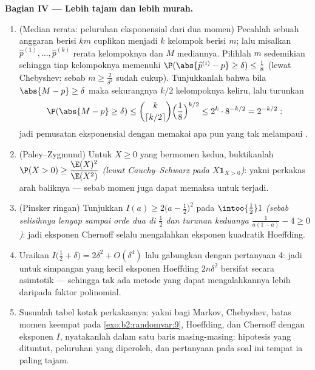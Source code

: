 \begin{problem}
\medskip
\noindent\textbf{Bagian IV --- Lebih tajam dan lebih murah.}
\begin{enumerate}[resume]
  \item (Median rerata: peluruhan eksponensial dari dua momen)
        Pecahlah sebuah anggaran berisi $km$ cuplikan menjadi $k$ kelompok
         berisi $m$; lalu misalkan $\widehat p^{(1)}, \dots, \widehat
        p^{(k)}$ rerata kelompoknya dan $M$ mediannya.
        Pilihlah $m$ sedemikian sehingga tiap kelompoknya memenuhi
        $\P(\abs{\widehat p^{(i)} - p} \geq \delta) \leq
        \frac18$ (lewat Chebyshev: sebab $m \geq \frac2{\delta^2}$
        sudah cukup). Tunjukkanlah bahwa bila $\abs{M - p} \geq \delta$
        maka sekurangnya $k/2$ kelompoknya keliru, lalu turunkan
        \[
        \P(\abs{M - p} \geq \delta)
        \leq \binom{k}{\lceil k/2\rceil}\Bigl(\frac18
        \Bigr)^{k/2}
        \leq 2^k\cdot 8^{-k/2} = 2^{-k/2} :
        \]
        jadi pemusatan eksponensial dengan memakai apa pun yang tak melampaui
        .
  \item (Paley--Zygmund) Untuk $X \geq 0$ yang bermomen kedua,
        buktikanlah $\P(X > 0) \geq \dfrac{\E(X)^2}{\E(X^2)}$
        \emph{(lewat Cauchy--Schwarz pada $X\mathbf 1_{X>0}$)}: yakni
        perkakas arah baliknya --- sebab momen juga dapat memaksa
         untuk terjadi.
  \item (Pinsker ringan) Tunjukkan $I(a) \geq 2\bigl(a -
        \tfrac12\bigr)^2$ pada $\intoo{\frac12}1$ \emph{(sebab
        selisihnya lenyap sampai orde dua di $\frac12$ dan
        turunan keduanya $\frac1{a(1-a)} - 4 \geq
        0$)}: jadi eksponen  Chernoff selalu mengalahkan
        eksponen kuadratik Hoeffding.
  \item Uraikan $I\bigl(\tfrac12 + \delta\bigr) = 2\delta^2 +
        O(\delta^4)$ lalu gabungkan dengan pertanyaan 4: jadi untuk
        simpangan yang kecil eksponen Hoeffding $2n\delta^2$ bersifat
        \emph{} secara asimtotik --- sehingga tak ada metode yang dapat mengalahkannya
        lebih daripada faktor polinomial.
  \item Susunlah tabel kotak perkakasnya: yakni bagi Markov, Chebyshev, batas
        momen keempat pada \cref{exo:b2:randomvar:9},
        Hoeffding, dan Chernoff dengan eksponen $I$, nyatakanlah dalam
        satu baris masing-masing: hipotesis yang dituntut, peluruhan yang diperoleh,
        dan pertanyaan pada soal ini tempat ia paling tajam.
\end{enumerate}


\end{problem}
